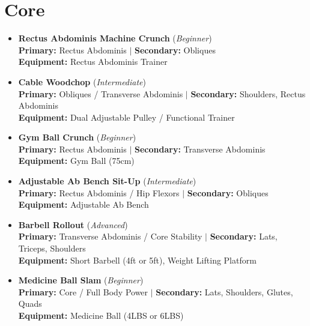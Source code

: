 \documentclass[11pt,a4paper]{article}
\begin{document}
\section*{Core}
\begin{itemize}[leftmargin=*]
  \item \textbf{Rectus Abdominis Machine Crunch} (\textit{Beginner})\\
        \textbf{Primary:} Rectus Abdominis $|$ \textbf{Secondary:} Obliques\\
        \textbf{Equipment:} Rectus Abdominis Trainer
  \item \textbf{Cable Woodchop} (\textit{Intermediate})\\
        \textbf{Primary:} Obliques / Transverse Abdominis $|$ \textbf{Secondary:} Shoulders, Rectus Abdominis\\
        \textbf{Equipment:} Dual Adjustable Pulley / Functional Trainer
  \item \textbf{Gym Ball Crunch} (\textit{Beginner})\\
        \textbf{Primary:} Rectus Abdominis $|$ \textbf{Secondary:} Transverse Abdominis\\
        \textbf{Equipment:} Gym Ball (75cm)
  \item \textbf{Adjustable Ab Bench Sit-Up} (\textit{Intermediate})\\
        \textbf{Primary:} Rectus Abdominis / Hip Flexors $|$ \textbf{Secondary:} Obliques\\
        \textbf{Equipment:} Adjustable Ab Bench
  \item \textbf{Barbell Rollout} (\textit{Advanced})\\
        \textbf{Primary:} Transverse Abdominis / Core Stability $|$ \textbf{Secondary:} Lats, Triceps, Shoulders\\
        \textbf{Equipment:} Short Barbell (4ft or 5ft), Weight Lifting Platform
  \item \textbf{Medicine Ball Slam} (\textit{Beginner})\\
        \textbf{Primary:} Core / Full Body Power $|$ \textbf{Secondary:} Lats, Shoulders, Glutes, Quads\\
        \textbf{Equipment:} Medicine Ball (4LBS or 6LBS)
\end{itemize}
\vspace{0.5em}
\end{document}
